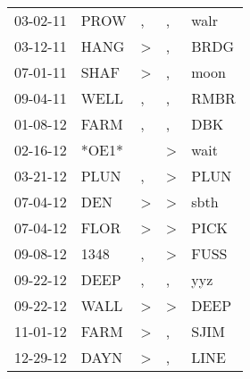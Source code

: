 \begin{supertabular}{p{0.07\textwidth}p{0.06\textwidth}p{0.02\textwidth}p{0.02\textwidth}p{0.06\textwidth}}
          03-02-11\textsuperscript{} &           PROW\textsuperscript{} &                , &                , &           walr\textsuperscript{} \\
          03-12-11\textsuperscript{} &           HANG\textsuperscript{} &     \textgreater &                , &           BRDG\textsuperscript{} \\
          07-01-11\textsuperscript{} &           SHAF\textsuperscript{} &     \textgreater &                , &           moon\textsuperscript{} \\
          09-04-11\textsuperscript{} &           WELL\textsuperscript{} &                , &                , &           RMBR\textsuperscript{} \\
          01-08-12\textsuperscript{} &           FARM\textsuperscript{} &                , &                , &            DBK\textsuperscript{} \\
          02-16-12\textsuperscript{} &                            *OE1* &                  &     \textgreater &           wait\textsuperscript{} \\
          03-21-12\textsuperscript{} &           PLUN\textsuperscript{} &                , &     \textgreater &           PLUN\textsuperscript{} \\
          07-04-12\textsuperscript{} &            DEN\textsuperscript{} &     \textgreater &     \textgreater &           sbth\textsuperscript{} \\
          07-04-12\textsuperscript{} &           FLOR\textsuperscript{} &     \textgreater &     \textgreater &           PICK\textsuperscript{} \\
          09-08-12\textsuperscript{} &           1348\textsuperscript{} &                , &     \textgreater &           FUSS\textsuperscript{} \\
          09-22-12\textsuperscript{} &           DEEP\textsuperscript{} &                , &                , &            yyz\textsuperscript{} \\
          09-22-12\textsuperscript{} &           WALL\textsuperscript{} &     \textgreater &     \textgreater &           DEEP\textsuperscript{} \\
          11-01-12\textsuperscript{} &           FARM\textsuperscript{} &     \textgreater &                , &           SJIM\textsuperscript{} \\
          12-29-12\textsuperscript{} &           DAYN\textsuperscript{} &     \textgreater &                , &           LINE\textsuperscript{} \\

\end{supertabular}
